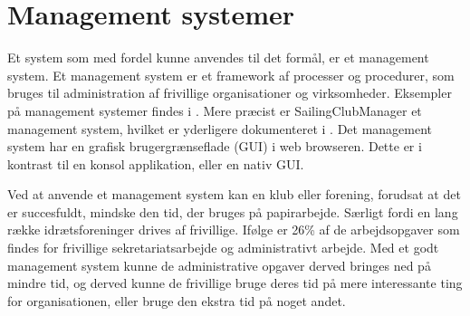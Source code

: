 \section{Management systemer}\label{sec:management-systemer}


Et system som med fordel kunne anvendes til det formål, er et management system. Et management system er et framework af processer og procedurer, som bruges til administration af frivillige organisationer og virksomheder.  
Eksempler på management systemer findes i . 
Mere præcist er SailingClubManager et management system, hvilket er yderligere dokumenteret i . 
Det management system har en grafisk brugergrænseflade (GUI) i web browseren. 
Dette er i kontrast til en konsol applikation, eller en nativ GUI. 
\newline 

Ved at anvende et management system kan en klub eller forening, forudsat at det er succesfuldt, mindske den tid, der bruges på papirarbejde. Særligt fordi en lang række idrætsforeninger drives af frivillige. 
Ifølge \citet{Frivilligrapporten} er 26\% af de arbejdsopgaver som findes for frivillige sekretariatsarbejde og administrativt arbejde. Med et godt management system kunne de administrative opgaver derved bringes ned på mindre tid, og derved kunne de frivillige bruge deres tid på mere interessante ting for organisationen, eller bruge den ekstra tid på noget andet.




